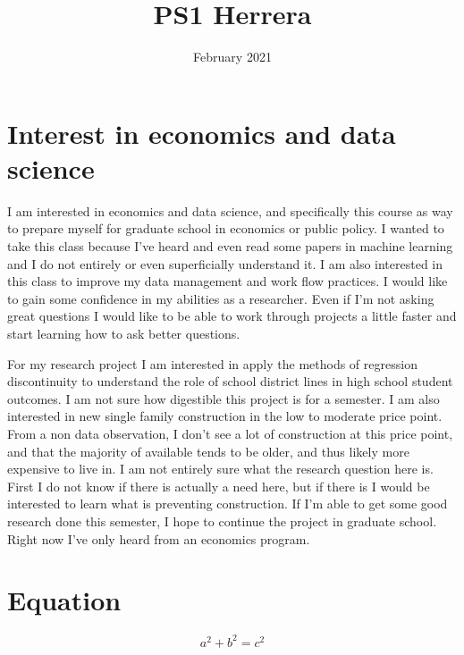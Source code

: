 \documentclass{article}
\title{PS1 Herrera}
\date{February 2021}
\begin{document}
\maketitle

\section{Interest in economics and data science}
\par
I am interested in economics and data science, and specifically this course as way to prepare myself for graduate school in economics or public policy. I wanted to take this class because I've heard and even read some papers in machine learning and I do not entirely or even superficially understand it. I am also interested in this class to improve my data management and work flow practices. I would like to gain some confidence in my abilities as a researcher. Even if I'm not asking great questions I would like to be able to work through projects a little faster and start learning how to ask better questions. 
\par
For my research project I am interested in apply the methods of regression discontinuity to understand the role of school district lines in high school student outcomes. I am not sure how digestible this project is for a semester. I am also interested in new single family construction in the low to moderate price point. From a non data observation, I don't see a lot of construction at this price point, and that the majority of available tends to be older, and thus likely more expensive to live in. I am not entirely sure what the research question here is. First I do not know if there is actually a need here, but if there is I would be interested to learn what is preventing construction. If I'm able to get some good research done this semester, I hope to continue the project in graduate school. Right now I've only heard from an economics program.

\section{Equation}
\[a^2+b^2=c^2\]\
\end{document}
